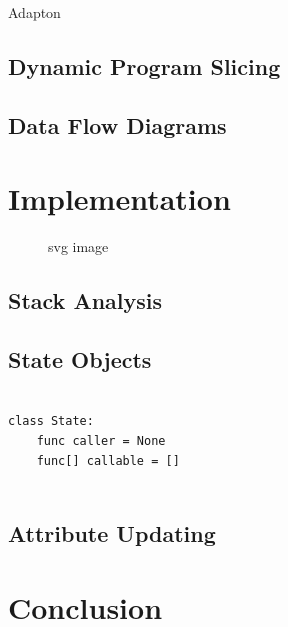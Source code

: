 \documentclass[runningheads]{llncs}
\begin{document}
Adapton \cite{DBLP:conf/pldi/HammerKHF14}

\subsection{Dynamic Program Slicing}

\subsection{Data Flow Diagrams}


\section{Implementation}



\begin{figure}
  \centering
  
  \caption{svg image}
\end{figure}


\subsection{Stack Analysis}

\subsection{State Objects}

\begin{lstlisting}

class State:
    func caller = None
    func[] callable = []
    
\end{lstlisting}

\subsection{Attribute Updating}





\section{Conclusion}


%
%
%


%
\end{document}

